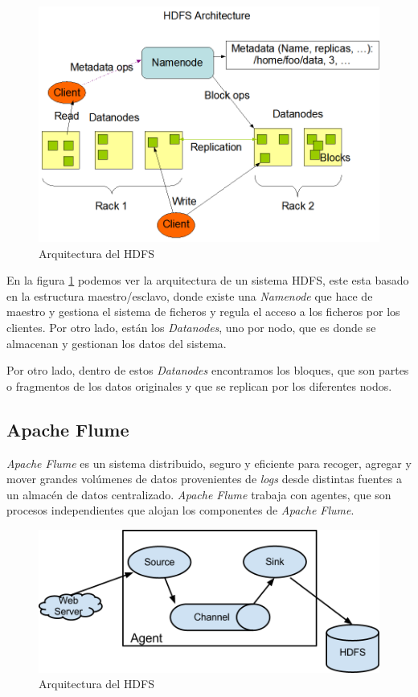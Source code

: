 \begin{figure}[htp!]
	\centering
	\caption{Arquitectura del \gls{HDFS} \cite{hadoop}}
	\label{hdfsarchitecture}
	\vspace{5pt}
	\includegraphics[scale=0.6]{graphics/hdfsarchitecture}
\end{figure}

En la figura \ref{hdfsarchitecture} podemos ver la arquitectura de un sistema \gls{HDFS}, este esta basado en la estructura maestro/esclavo, donde existe una \textit{Namenode} que hace de maestro y gestiona el sistema de ficheros y regula el acceso a los ficheros por los clientes. Por otro lado, están los \textit{Datanodes}, uno por nodo, que es donde se almacenan y gestionan los datos del sistema.

Por otro lado, dentro de estos \textit{Datanodes} encontramos los bloques, que son partes o fragmentos de los datos originales y que se replican por los diferentes nodos.

\subsection{Apache Flume \label{flume}}
\textit{Apache Flume} \cite{flume} es un sistema distribuido, seguro y eficiente para recoger, agregar y mover grandes volúmenes de datos provenientes de \textit{logs} desde distintas fuentes a un almacén de datos centralizado. \textit{Apache Flume} trabaja con agentes, que son procesos independientes que alojan los componentes de \textit{Apache Flume}.

\begin{figure}[htp!]
	\centering
	\caption{Arquitectura del \gls{HDFS} \cite{flumeArch}}
	\label{flumearchitecture}
	\vspace{5pt}
	\includegraphics[scale=0.8]{graphics/flumearch}
\end{figure}

